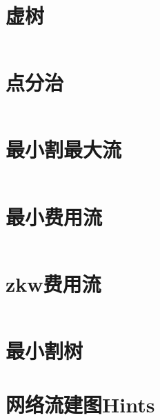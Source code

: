 \section{虚树}
\inputminted{cpp}{\source/graph-theory/mirage-tree.cpp}
\section{点分治}
\inputminted{cpp}{\source/graph-theory/vertex-partition.cpp}
\section{最小割最大流}
\inputminted{cpp}{\source/graph-theory/dinic.cpp}
\section{最小费用流}
\inputminted{cpp}{\source/graph-theory/mincost-maxflow.cpp}
\section{zkw费用流}
\inputminted{cpp}{\source/graph-theory/zkw-cost-flow.cpp}
\section{最小割树}
\section{网络流建图Hints}
